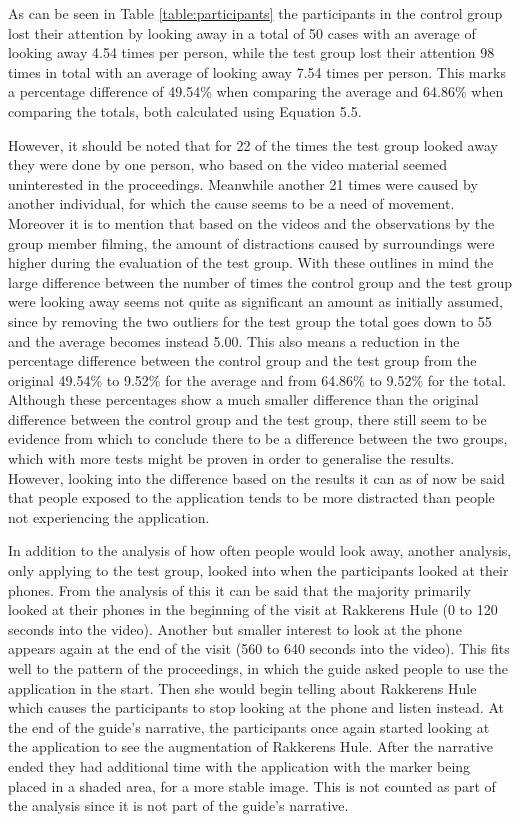 As can be seen in Table \ref{table:participants} the participants in the control group lost their attention by looking away in a total of 50 cases with an average of looking away 4.54 times per person, while the test group lost their attention 98 times in total with an average of looking away 7.54 times per person. This marks a percentage difference of 49.54\% when comparing the average and 64.86\% when comparing the totals, both calculated using Equation 5.5. 

However, it should be noted that for 22 of the times the test group looked away they were done by one person, who based on the video material seemed uninterested in the proceedings. Meanwhile another 21 times were caused by another individual, for which the cause seems to be a need of movement. Moreover it is to mention that based on the videos and the observations by the group member filming, the amount of distractions caused by surroundings were higher during the evaluation of the test group. With these outlines in mind the large difference between the number of times the control group and the test group were looking away seems not quite as significant an amount as initially assumed, since by removing the two outliers for the test group the total goes down to 55 and the average becomes instead 5.00. This also means a reduction in the percentage difference between the control group and the test group from the original 49.54\% to 9.52\% for the average and from 64.86\% to 9.52\% for the total. Although these percentages show a much smaller difference than the original difference between the control group and the test group, there still seem to be evidence from which to conclude there to be a difference between the two groups, which with more tests might be proven in order to generalise the results. However, looking into the difference based on the results it can as of now be said that people exposed to the application tends to be more distracted than people not experiencing the application.  

In addition to the analysis of how often people would look away, another analysis, only applying to the test group, looked into when the participants looked at their phones. From the analysis of this it can be said that the majority primarily looked at their phones in the beginning of the visit at Rakkerens Hule (0 to 120 seconds into the video). Another but smaller interest to look at the phone appears again at the end of the visit (560 to 640 seconds into the video). This fits well to the pattern of the proceedings, in which the guide asked people to use the application in the start. Then she would begin telling about Rakkerens Hule which causes the participants to stop looking at the phone and listen instead. At the end of the guide’s narrative, the participants once again started looking at the application to see the augmentation of Rakkerens Hule. After the narrative ended they had additional time with the application with the marker being placed in a shaded area, for a more stable image. This is not counted as part of the analysis since it is not part of the guide’s narrative.

